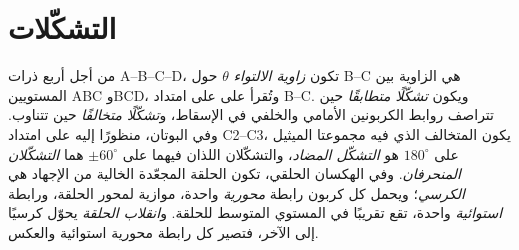 \section{التشكّلات}

\begin{definition}\label{def:b1:stereochemistry-in-depth:conformations}
من أجل أربع ذرات A--B--C--D، تكون \emph{زاوية الالتواء}
$\theta$ حول B--C هي الزاوية بين المستويين ABC وBCD، وتُقرأ على
 على امتداد B--C. ويكون  \emph{تشكّلًا
متطابقًا} حين تتراصف روابط الكربونين الأمامي
والخلفي في الإسقاط، و\emph{تشكّلًا
متخالفًا} حين تتناوب. وفي
البوتان، منظورًا إليه على امتداد C2--C3، يكون  المتخالف الذي فيه
مجموعتا الميثيل على $180^\circ$ هو \emph{التشكّل المضاد}،
والتشكّلان اللذان فيهما على $\pm 60^\circ$ هما \emph{التشكّلان
المنحرفان}. وفي الهكسان الحلقي، تكون
الحلقة المجعّدة الخالية من الإجهاد هي \emph{الكرسي}؛ ويحمل كل كربون
رابطة \emph{محورية} واحدة، موازية لمحور
الحلقة، ورابطة \emph{استوائية} واحدة، تقع تقريبًا في
المستوي المتوسط للحلقة. و\emph{انقلاب الحلقة} يحوّل
كرسيًا إلى الآخر، فتصير كل رابطة محورية استوائية
والعكس.
\end{definition}

